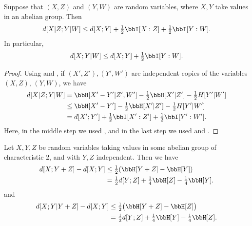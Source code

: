 \begin{lemma}\label{cond-dist-fact}
  \leanok
  Suppose that $(X, Z)$ and $(Y, W)$ are random variables, where $X, Y$ take values in an abelian group. Then
  \[   d[X  | Z;Y | W] \leq d[X ; Y] + \tfrac{1}{2}  \bbI[X : Z] + \tfrac{1}{2}  \bbI[Y : W].\]
  In particular,
  \[   d[X ;Y | W] \leq d[X ; Y] + \tfrac{1}{2}  \bbI[Y : W].\]
\end{lemma}

\begin{proof}\leanok
Using  and , if $(X',Z'), (Y',W')$ are independent copies of the variables $(X,Z)$, $(Y,W)$, we have
\begin{align*}
  d[X  | Z; Y | W]&= \bbH[X'-Y'|Z',W'] - \tfrac{1}{2} \bbH[X'|Z'] - \tfrac{1}{2}H[Y'|W'] \\
                       &\le \bbH[X'-Y']- \tfrac{1}{2} \bbH[X'|Z'] - \tfrac{1}{2}H[Y'|W'] \\
                       &= d[X';Y'] + \tfrac{1}{2}  \bbI[X' : Z'] + \tfrac{1}{2}  \bbI[Y' : W'].
\end{align*}
Here, in the middle step we used , and in the last step we used  and .
\end{proof}

\begin{lemma}\label{first-useful}
  \leanok
  Let $X, Y, Z$ be random variables taking values in some abelian group of characteristic $2$, and with $Y, Z$ independent. Then we have
  \begin{align}\nonumber d[X ; Y + Z] -d[X ; Y] &  \leq \tfrac{1}{2} (\bbH[Y+ Z] - \bbH[Y]) \\ & = \tfrac{1}{2} d[Y; Z] + \tfrac{1}{4} \bbH[Z] - \tfrac{1}{4} \bbH[Y]. \label{lem51-a} \end{align}
  and
  \begin{align}\nonumber
  d[X ;Y|Y+ Z] - d[X ;Y] & \leq \tfrac{1}{2} \bigl(\bbH[Y+ Z] - \bbH[Z]\bigr) \\ & = \tfrac{1}{2} d[Y;Z] + \tfrac{1}{4} \bbH[Y] - \tfrac{1}{4} \bbH[Z].
    \label{ruzsa-3}
  \end{align}
  \end{lemma}

